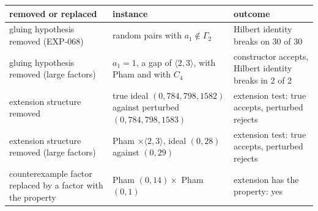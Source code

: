 \begin{tabular}{>{\raggedright\arraybackslash}p{4.6cm}>{\raggedright\arraybackslash}p{5.4cm}>{\raggedright\arraybackslash}p{4.6cm}}
\toprule
removed or replaced & instance & outcome\\
\midrule
gluing hypothesis removed (EXP-068) & 30 random pairs with $a_1\notin\Gamma_2$ & Hilbert identity breaks on 30 of 30 \\
gluing hypothesis removed (large factors) & $a_1=1$, a gap of $\langle2,3\rangle$, with Pham and with $C_4$ & constructor accepts, Hilbert identity breaks in 2 of 2 \\
extension structure removed & true ideal $(0,784,798,1582)$ against perturbed $(0,784,798,1583)$ & extension test: true accepts, perturbed rejects \\
extension structure removed (large factors) & Pham $\times\langle2,3\rangle$, ideal $(0,28)$ against $(0,29)$ & extension test: true accepts, perturbed rejects \\
counterexample factor replaced by a factor with the property & Pham $(0,14)\times$ Pham $(0,1)$ & extension has the property: yes \\
\bottomrule
\end{tabular}

